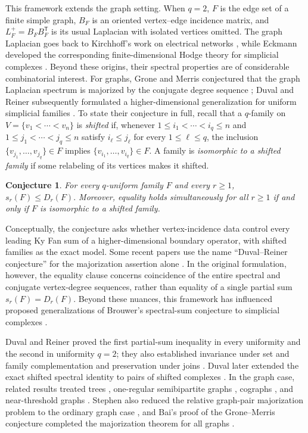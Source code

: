 \documentclass[11pt]{article}
\newtheorem{conjecture}[theorem]{Conjecture}
\begin{document}
This framework extends the graph setting. When \(q=2\), \(F\) is the
edge set of a finite simple graph, \(B_F\) is an oriented vertex--edge
incidence matrix, and \(L_F^+=B_FB_F^{\mathsf T}\) is its usual
Laplacian with isolated vertices omitted. The graph Laplacian goes back
to Kirchhoff's work on electrical networks \cite{Kirchhoff1847}, while
Eckmann developed the corresponding finite-dimensional Hodge theory for
simplicial complexes \cite{Eckmann1944}.
Beyond these origins, their spectral properties are of considerable combinatorial interest.
For graphs, Grone and Merris conjectured
that the graph Laplacian spectrum is majorized by the conjugate degree
sequence \cite{GroneMerris1994}; Duval and Reiner subsequently formulated a higher-dimensional generalization
for
uniform simplicial families
\cite[Conjecture~1.2]{DuvalReiner2002}.
To state their conjecture in full, recall that a \(q\)-family on
\(V=\{v_1<\cdots<v_n\}\) is \emph{shifted} if, whenever
\(1\le i_1<\cdots<i_q\le n\) and
\(1\le j_1<\cdots<j_q\le n\) satisfy
\(i_\ell\le j_\ell\) for every \(1\le\ell\le q\), the inclusion
$
\{v_{j_1},\ldots,v_{j_q}\}\in F
$
implies
$
\{v_{i_1},\ldots,v_{i_q}\}\in F.
$
A family is \emph{isomorphic to a shifted family} if some relabeling of
its vertices makes it shifted.
\begin{conjecture}
\label{conj:duval-reiner}
For every \(q\)-uniform family \(F\) and every \(r\ge1\), $s_r(F)\leq D_r(F).$
Moreover, equality holds simultaneously for all \(r\ge1\) if and only if
\(F\) is isomorphic to a shifted family.
\end{conjecture}

Conceptually, the conjecture asks whether vertex-incidence data control
every leading Ky Fan sum of a higher-dimensional boundary operator, with
shifted families as the exact model.
Some recent papers use the name ``Duval--Reiner conjecture'' for the
majorization assertion alone \cite{HanLuWang2026,Lew2025}. In the
original formulation, however, the equality clause concerns coincidence
of the entire spectral and conjugate vertex-degree sequences, rather
than equality of a single partial sum \(s_r(F)=D_r(F)\).
Beyond these nuances, this framework has influenced proposed generalizations of Brouwer's
spectral-sum conjecture to simplicial complexes \cite{Abebe12,Abebe}.


Duval and Reiner proved the first partial-sum inequality in every
uniformity and the second in uniformity \(q=2\); they also established
invariance under set and family complementation and preservation under
joins \cite{DuvalReiner2002}. Duval later extended the exact
shifted spectral identity to pairs of shifted complexes
\cite{Duval2005}. In the graph case, related results treated trees
\cite{Stephen2007}, one-regular semibipartite graphs \cite{Katz2005},
cographs \cite{BapatLalPati2008}, and near-threshold graphs
\cite{Kirkland2009}. Stephen also reduced the relative graph-pair
majorization problem to the ordinary graph case \cite{Stephen2007}, and
Bai's proof of the Grone--Merris conjecture completed the majorization
theorem for all graphs \cite{Bai2011}.
\end{document}
